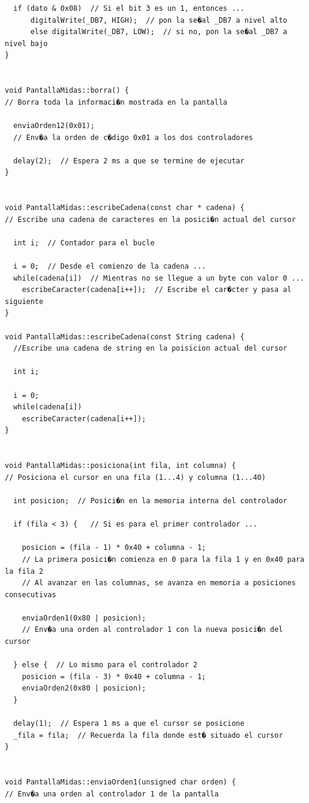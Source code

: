 \documentclass[11pt,twoside]{book}
\begin{document}
\begin{lstlisting}
  if (dato & 0x08)  // Si el bit 3 es un 1, entonces ...
      digitalWrite(_DB7, HIGH);  // pon la se�al _DB7 a nivel alto
      else digitalWrite(_DB7, LOW);  // si no, pon la se�al _DB7 a nivel bajo
}


void PantallaMidas::borra() {
// Borra toda la informaci�n mostrada en la pantalla

  enviaOrden12(0x01); 
  // Env�a la orden de c�digo 0x01 a los dos controladores
  
  delay(2);  // Espera 2 ms a que se termine de ejecutar
}


void PantallaMidas::escribeCadena(const char * cadena) {
// Escribe una cadena de caracteres en la posici�n actual del cursor

  int i;  // Contador para el bucle
  
  i = 0;  // Desde el comienzo de la cadena ...
  while(cadena[i])  // Mientras no se llegue a un byte con valor 0 ...
    escribeCaracter(cadena[i++]);  // Escribe el car�cter y pasa al siguiente
}

void PantallaMidas::escribeCadena(const String cadena) {
  //Escribe una cadena de string en la poisicion actual del cursor

  int i;

  i = 0;
  while(cadena[i])
    escribeCaracter(cadena[i++]);
}


void PantallaMidas::posiciona(int fila, int columna) {
// Posiciona el cursor en una fila (1...4) y columna (1...40)

  int posicion;  // Posici�n en la memoria interna del controlador

  if (fila < 3) {   // Si es para el primer controlador ...
    
    posicion = (fila - 1) * 0x40 + columna - 1;
    // La primera posici�n comienza en 0 para la fila 1 y en 0x40 para la fila 2
    // Al avanzar en las columnas, se avanza en memoria a posiciones consecutivas
    
    enviaOrden1(0x80 | posicion);
    // Env�a una orden al controlador 1 con la nueva posici�n del cursor
    
  } else {  // Lo mismo para el controlador 2
    posicion = (fila - 3) * 0x40 + columna - 1;
    enviaOrden2(0x80 | posicion);
  }
  
  delay(1);  // Espera 1 ms a que el cursor se posicione
  _fila = fila;  // Recuerda la fila donde est� situado el cursor
}


void PantallaMidas::enviaOrden1(unsigned char orden) {
// Env�a una orden al controlador 1 de la pantalla


\end{lstlisting}
\end{document}
